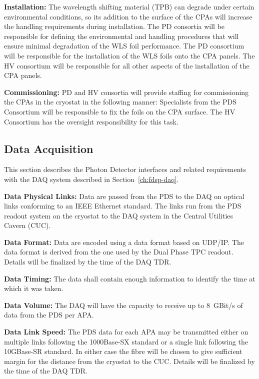 \textbf{Installation:} The wavelength shifting material (TPB) can degrade under certain environmental conditions, so its addition to the surface of the CPAs will increase the handling requirements during installation. The PD consortia will be responsible for defining the environmental and handling procedures that will ensure minimal degradation of the WLS foil performance. The PD consortium will be responsible for the installation of the WLS foils onto the CPA panels. The HV consortium will be responsible for all other aspects of the installation of the CPA panels.

\textbf{Commissioning:} PD and HV consortia will provide staffing for commissioning the CPAs in the cryostat in the following manner: Specialists from the PDS Consortium will be responsible to fix the foils on the CPA surface. The HV Consortium has the oversight responsibility for this task.


\subsection{Data Acquisition}
\label{sec:fdsp-pd-intfc-daq}

This section describes the Photon Detector interfaces and related requirements with the DAQ system described in Section~\ref{ch:fdsp-daq}.

\textbf{Data Physical Links: }Data are passed from the PDS to the DAQ on optical links conforming to an IEEE Ethernet standard. The links run from the PDS readout system on the cryostat to the DAQ system in the Central Utilities Cavern (CUC).

\textbf{Data Format:} Data are encoded using a data format based on UDP/IP. The data format is derived from the one used by the Dual Phase TPC readout. Details will be finalized by the time of the DAQ TDR.

\textbf{Data Timing:} The data shall contain enough information to identify the time  at which it was taken.

\textbf{Data Volume:} The DAQ will have the capacity to receive up to 8~GBit/s of data from the PDS per APA.

\textbf{Data Link Speed: }The PDS data for each APA may be transmitted either on multiple links following the 1000Base-SX standard or a single link following the 10GBase-SR standard. In either case the fibre will be chosen to give sufficient margin for the distance from the cryostat to the CUC. Details will be finalized by the time of the DAQ TDR.

